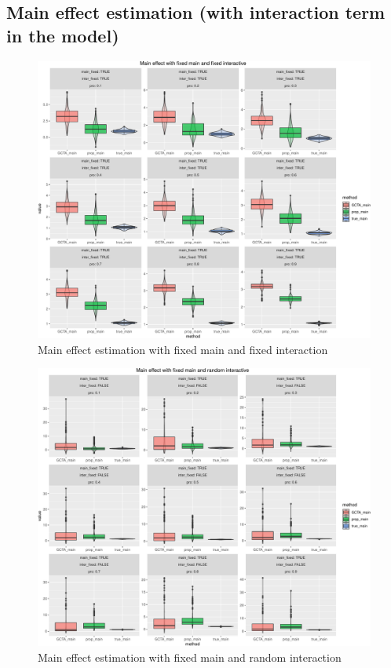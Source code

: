 \documentclass[]{article}
\begin{document}
\newpage 

\subsection{Main effect estimation (with interaction term in the
model)}\label{main-effect-estimation-with-interaction-term-in-the-model}

\begin{figure}
\centering
\includegraphics{Simulation_report_files/figure-latex/main effect fixed fixed-1.pdf}
\caption{Main effect estimation with fixed main and fixed interaction}
\end{figure}

\begin{figure}
\centering
\includegraphics{Simulation_report_files/figure-latex/main effect fixed random-1.pdf}
\caption{Main effect estimation with fixed main and random interaction}
\end{figure}
\end{document}
